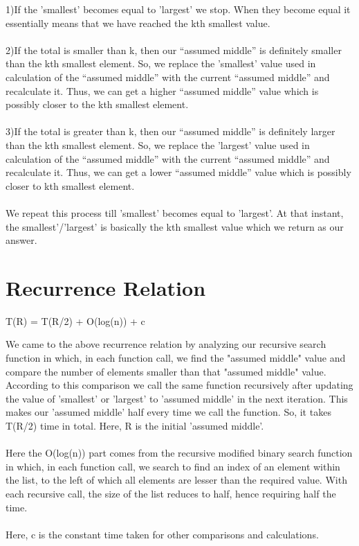 \documentclass{article}
\begin{document}
1)If the 'smallest' becomes equal to 'largest' we stop. When they become equal it essentially means that we have reached the kth smallest value.
\\\\
2)If the total is smaller than k, then our “assumed middle” is definitely smaller than the kth smallest element. So, we replace the 'smallest' value used in calculation of the “assumed middle” with the current “assumed middle” and recalculate it. Thus, we can get a higher “assumed middle” value which is possibly closer to the kth smallest element.
\\\\
3)If the total is greater than k, then our “assumed middle” is definitely larger than the kth smallest element. So, we replace the 'largest' value used in calculation of the “assumed middle” with the current “assumed middle” and recalculate it. Thus, we can get a lower “assumed middle” value which is possibly closer to kth smallest element.
\\\\
We repeat this process till 'smallest' becomes equal to 'largest'. At that instant, the smallest'/'largest' is basically the kth smallest value which we return as our answer.


\section{Recurrence Relation}
\begin{center}
T(R) = T(R/2) + O(log(n)) + c
\end{center}
We came to the above recurrence relation by analyzing our recursive search function in which, in each function call, we find the "assumed middle" value and compare the number of elements smaller than that "assumed middle" value. According to this comparison we call the same function recursively after updating the value of 'smallest' or 'largest' to 'assumed middle' in the next iteration. This makes our 'assumed middle' half every time we call the function. So, it takes T(R/2) time in total. Here, R is the initial 'assumed middle'.
\\\\Here the O(log(n)) part comes from the recursive modified binary search function in which, in each function call, we search to find an index of an element within the list, to the left of which all elements are lesser than the required value. With each recursive call, the size of the list reduces to half, hence requiring half the time.
\\\\Here, c is the constant time taken for other comparisons and calculations.
\end{document}
